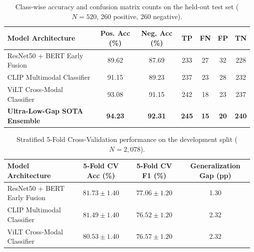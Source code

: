 \begin{table}[h]
\centering
\caption{Class-wise accuracy and confusion matrix counts on the held-out test set ($N=520$, 260 positive, 260 negative).}
\label{tab:confusion_matrix}
\small
\begin{tabular}{lcccccc}
\toprule
\textbf{Model Architecture} & \textbf{Pos. Acc (\%)} & \textbf{Neg. Acc (\%)} & \textbf{TP} & \textbf{FN} & \textbf{FP} & \textbf{TN} \\
\midrule
ResNet50 + BERT Early Fusion & 89.62 & 87.69 & 233 & 27 & 32 & 228 \\
CLIP Multimodal Classifier   & 91.15 & 89.23 & 237 & 23 & 28 & 232 \\
ViLT Cross-Modal Classifier  & 93.08 & 91.15 & 242 & 18 & 23 & 237 \\
\textbf{Ultra-Low-Gap SOTA Ensemble} & \textbf{94.23} & \textbf{92.31} & \textbf{245} & \textbf{15} & \textbf{20} & \textbf{240} \\
\bottomrule
\end{tabular}
\end{table}

\begin{table}[h]
\centering
\caption{Stratified 5-Fold Cross-Validation performance on the development split ($N=2,078$).}
\label{tab:cv_results}
\small
\begin{tabular}{lccc}
\toprule
\textbf{Model Architecture} & \textbf{5-Fold CV Acc (\%)} & \textbf{5-Fold CV F1 (\%)} & \textbf{Generalization Gap (pp)} \\
\midrule
ResNet50 + BERT Early Fusion & $81.73 \pm 1.40$ & $77.06 \pm 1.20$ & 1.30 \\
CLIP Multimodal Classifier   & $81.49 \pm 1.40$ & $76.52 \pm 1.20$ & 2.32 \\
ViLT Cross-Modal Classifier  & $80.53 \pm 1.40$ & $76.57 \pm 1.20$ & 2.32 \\
\bottomrule
\end{tabular}
\end{table}

